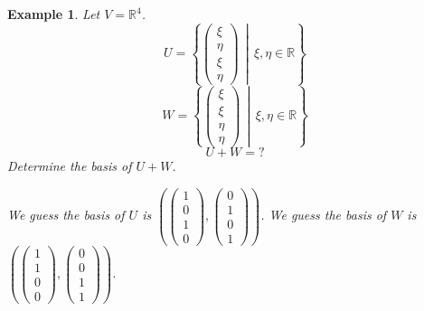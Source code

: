 \documentclass[a4paper,landscape,twocolumn]{article}
\newcommand\setdef[2]{\left\{#1\,\middle|\,#2\right\}}
\newtheorem{ex}{Example}[section]
\begin{document}
\begin{ex}
  Let $V = \mathbb R^4$.
  \[ U = \setdef{\begin{pmatrix} \xi \\ \eta \\ \xi \\ \eta \end{pmatrix}}{\xi, \eta \in \mathbb R} \]
  \[ W = \setdef{\begin{pmatrix} \xi \\ \xi \\ \eta \\ \eta \end{pmatrix}}{\xi, \eta \in \mathbb R} \]
  \[ U + W = ? \]
  Determine the basis of $U + W$.

  We guess the basis of $U$ is $\left(\begin{pmatrix} 1 \\ 0 \\ 1 \\ 0 \end{pmatrix}, \begin{pmatrix} 0 \\ 1 \\ 0 \\ 1 \end{pmatrix}\right)$.
  We guess the basis of $W$ is $\left(\begin{pmatrix} 1 \\ 1 \\ 0 \\ 0 \end{pmatrix}, \begin{pmatrix} 0 \\ 0 \\ 1 \\ 1 \end{pmatrix}\right)$.


\end{ex}
\end{document}
